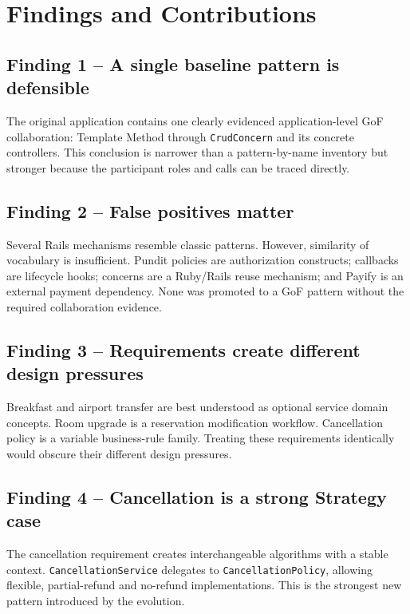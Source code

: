 \documentclass[10pt,a4paper]{article}
\newcommand{\code}[1]{\texttt{\small #1}}
\begin{document}
\section{Findings and Contributions}

\subsection{Finding 1 -- A single baseline pattern is defensible}

The original application contains one clearly evidenced application-level GoF collaboration: Template Method through \code{CrudConcern} and its concrete controllers. This conclusion is narrower than a pattern-by-name inventory but stronger because the participant roles and calls can be traced directly.

\subsection{Finding 2 -- False positives matter}

Several Rails mechanisms resemble classic patterns. However, similarity of vocabulary is insufficient. Pundit policies are authorization constructs; callbacks are lifecycle hooks; concerns are a Ruby/Rails reuse mechanism; and Payify is an external payment dependency. None was promoted to a GoF pattern without the required collaboration evidence.

\subsection{Finding 3 -- Requirements create different design pressures}

Breakfast and airport transfer are best understood as optional service domain concepts. Room upgrade is a reservation modification workflow. Cancellation policy is a variable business-rule family. Treating these requirements identically would obscure their different design pressures.

\subsection{Finding 4 -- Cancellation is a strong Strategy case}

The cancellation requirement creates interchangeable algorithms with a stable context. \code{CancellationService} delegates to \code{CancellationPolicy}, allowing flexible, partial-refund and no-refund implementations. This is the strongest new pattern introduced by the evolution.
\end{document}
